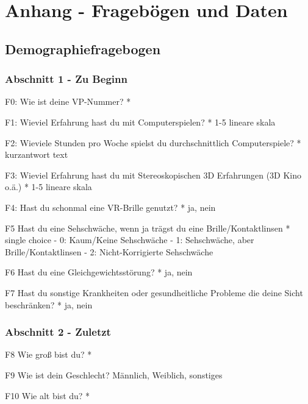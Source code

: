 \chapter*{Anhang - Fragebögen und Daten}
\label{anhang}

\section*{Demographiefragebogen}
\label{anhang:demo}

\subsection*{Abschnitt 1 - Zu Beginn}

F0: Wie ist deine VP-Nummer? *

F1: Wieviel Erfahrung hast du mit Computerspielen? *
1-5 lineare skala

F2: Wieviele Stunden pro Woche spielst du durchschnittlich Computerspiele? *
kurzantwort text

F3: Wieviel Erfahrung hast du mit Stereoskopischen 3D Erfahrungen (3D Kino o.ä.) *
1-5 lineare skala

F4: Hast du schonmal eine VR-Brille genutzt? *
ja, nein

F5 Hast du eine Sehschwäche, wenn ja trägst du eine Brille/Kontaktlinsen *
single choice
- 0: Kaum/Keine Sehschwäche
- 1: Sehschwäche, aber Brille/Kontaktlinsen
- 2: Nicht-Korrigierte Sehschwäche

F6 Hast du eine Gleichgewichtsstörung? *
ja, nein

F7 Hast du sonstige Krankheiten oder gesundheitliche Probleme die deine Sicht beschränken? *
ja, nein

\subsection*{Abschnitt 2 - Zuletzt}

F8 Wie groß bist du? *

F9 Wie ist dein Geschlecht?
Männlich, Weiblich, sonstiges

F10 Wie alt bist du? *

